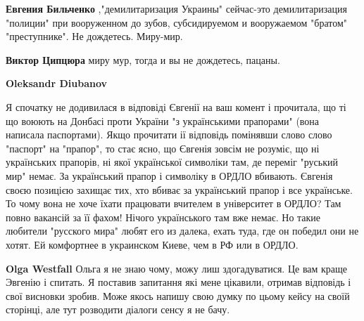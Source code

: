 \begin{itemize}
\begin{itemize}
\textbf{Евгения Бильченко} ,"демилитаризация Украины" сейчас-это
демилитаризация "полиции" при вооруженном до зубов, субсидируемом и вооружаемом
"братом" "преступнике". Не дождетесь. Миру-мир.

 
\textbf{Виктор Ципцюра} миру мур, тогда и вы не дождетесь, пацаны.

 
\textbf{Oleksandr Diubanov} 

Я спочатку не додивилася в відповіді Євгенії на ваш
комент і прочитала, що ті що воюють на Донбасі проти України "з українськими
прапорами" (вона написала паспортами). Якщо прочитати ії відповідь помінявши
слово слово "паспорт" на "прапор", то стає ясно, що Євгенія зовсім не розуміє,
що ні українських прапорів, ні якої української символіки там, де переміг
"руський мир" немає. За український прапор і символіку в ОРДЛО вбивають.
Євгенія своєю позицією захищає тих, хто вбиває за український прапор і все
українське. То чому вона не хоче їхати працювати вчителем в університет в
ОРДЛО? Там повно вакансій за її фахом! Нічого українського там вже немає. Но
такие любители "русского мира" любят его из далека, ехать туда, где он победил
они не хотят. Ей комфортнее в украинском Киеве, чем в РФ или в ОРДЛО.

 
\textbf{Olga Westfall} Ольга я не знаю чому, можу лиш здогадуватися. Це вам
краще Эвгенію і спитать. Я поставив запитання які мене цікавили, отримав
відповідь і свої висновки зробив. Може якось напишу свою думку по цьому кейсу
на своїй сторінці, але тут розводити діалоги сенсу я не бачу.


\end{itemize}

 


\end{itemize}
